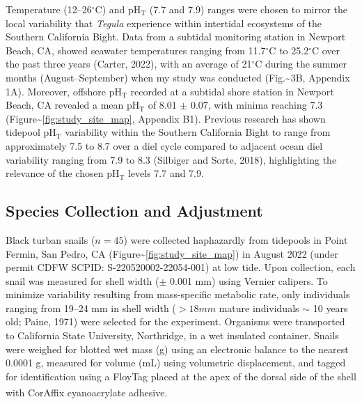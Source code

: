 \documentclass{CSUNthesis}
\begin{document}
Temperature (12--26\(^\circ\)C) and pH\(_\mathrm{T}\) (7.7 and 7.9) ranges were chosen to mirror the local variability that \textit{Tegula} experience within intertidal ecosystems of the Southern California Bight. Data from a subtidal monitoring station in Newport Beach, CA, showed seawater temperatures ranging from 11.7\(^\circ\)C to 25.2\(^\circ\)C over the past three years (Carter, 2022), with an average of 21\(^\circ\)C during the summer months (August--September) when my study was conducted (Fig.\textasciitilde3B, Appendix 1A). Moreover, offshore pH\(_\mathrm{T}\) recorded at a subtidal shore station in Newport Beach, CA revealed a mean pH\(_\mathrm{T}\) of 8.01 \(\pm\) 0.07, with minima reaching 7.3 (Figure\textasciitilde{}\ref{fig:study_site_map}, Appendix B1). Previous research has shown tidepool pH\(_\mathrm{T}\) variability within the Southern California Bight to range from approximately 7.5 to 8.7 over a diel cycle compared to adjacent ocean diel variability ranging from 7.9 to 8.3 (Silbiger and Sorte, 2018), highlighting the relevance of the chosen pH\(_\mathrm{T}\) levels 7.7 and 7.9.

\subsection*{Species Collection and Adjustment}\label{species-collection-and-adjustment}

Black turban snails (\(n=45\)) were collected haphazardly from tidepools in Point Fermin, San Pedro, CA (Figure\textasciitilde{}\ref{fig:study_site_map}) in August 2022 (under permit CDFW SCPID: S-220520002-22054-001) at low tide. Upon collection, each snail was measured for shell width (\(\pm\) 0.001 mm) using Vernier calipers. To minimize variability resulting from mass-specific metabolic rate, only individuals ranging from 19--24 mm in shell width (\(>18 mm\) mature individuals \(\sim\) 10 years old; Paine, 1971) were selected for the experiment. Organisms were transported to California State University, Northridge, in a wet insulated container. Snails were weighed for blotted wet mass (g) using an electronic balance to the nearest 0.0001 g, measured for volume (mL) using volumetric displacement, and tagged for identification using a FloyTag placed at the apex of the dorsal side of the shell with CorAffix\textsuperscript{\textregistered} cyanoacrylate adhesive.
\end{document}
